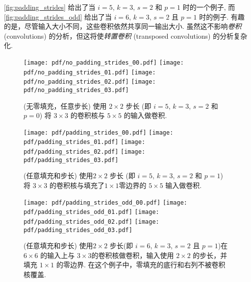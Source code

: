 \documentclass[notitlepage]{ctexrep}
\begin{document}
\autoref{fig:padding_strides} 给出了当 $i = 5$, $k = 3$, $s = 2$
和 $p = 1$ 时的一个例子, 而 \autoref{fig:padding_strides_odd} 给出了当 $i = 6$, $k = 3$, $s = 2$ 且 $p = 1$ 时的例子. 有趣的是，尽管输入大小不同，这些卷积依然共享同一输出大小. 虽然这不影响{\em 卷积}(convolutions) 的分析，但这将使{\em 转置卷积} (transposed convolutions) 的分析复杂化.

\begin{figure}[p]
    \centering
    \texttt{[image: pdf/no\_padding\_strides\_00.pdf]}
    \texttt{[image: pdf/no\_padding\_strides\_01.pdf]}
    \texttt{[image: pdf/no\_padding\_strides\_02.pdf]}
    \texttt{[image: pdf/no\_padding\_strides\_03.pdf]}
    \caption{\label{fig:no_padding_strides} (无零填充，任意步长) 
    使用 $2 \times 2$ 步长 (即 $i = 5$, $k = 3$, $s = 2$ 和 $p = 0$) 将 $3 \times 3$ 的卷积核与 $5 \times 5$ 的输入做卷积.}
\end{figure}

\begin{figure}[p]
    \centering
    \texttt{[image: pdf/padding\_strides\_00.pdf]}
    \texttt{[image: pdf/padding\_strides\_01.pdf]}
    \texttt{[image: pdf/padding\_strides\_02.pdf]}
    \texttt{[image: pdf/padding\_strides\_03.pdf]}
    \caption{\label{fig:padding_strides} (任意填充和步长)
    使用$2 \times 2$ 步长 (即 $i = 5$, $k = 3$, $s = 2$ 和 $p = 1$) 将 $3 \times 3$ 的卷积核与填充了$1 \times 1$零边界的 $5 \times 5$ 输入做卷积. }
\end{figure}

\begin{figure}[p]
    \centering
    \texttt{[image: pdf/padding\_strides\_odd\_00.pdf]}
    \texttt{[image: pdf/padding\_strides\_odd\_01.pdf]}
    \texttt{[image: pdf/padding\_strides\_odd\_02.pdf]}
    \texttt{[image: pdf/padding\_strides\_odd\_03.pdf]}
    \caption{\label{fig:padding_strides_odd} (任意填充和步长)
    使用$2 \times 2$ 步长(即 $i = 6$, $k = 3$, $s = 2$ 且 $p = 1$)在 $6 \times 6$ 的输入上与 $3 \times 3$的卷积核做卷积，输入使用 $2 \times 2$ 的步长，并填充 $1 \times 1$ 的零边界. 在这个例子中，零填充的底行和右列不被卷积核覆盖.}
\end{figure}
\end{document}
